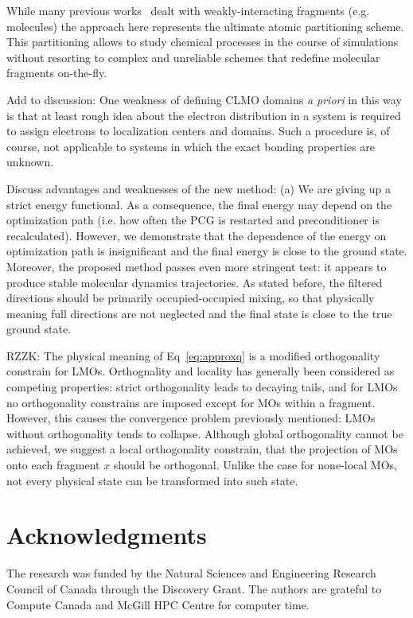 \documentclass[aps,prl,twocolumn,reprint,amsmath,amssymb]{revtex4-1}
\begin{document}
While many previous works~\cite{RZZK} dealt with weakly-interacting fragments (e.g. molecules) the approach here represents the ultimate atomic partitioning scheme. This partitioning allows to study chemical processes in the course of simulations without resorting to complex and unreliable schemes that redefine molecular fragments on-the-fly.

Add to discussion: One weakness of defining CLMO domains \emph{a priori} in this way is that at least rough idea about the electron distribution in a system is required to assign electrons to localization centers and domains. Such a procedure is, of course, not applicable to systems in which the exact bonding properties are unknown.

Discuss advantages and weaknesses of the new method: (a) We are giving up a strict energy functional. As a consequence, the final energy may depend on the optimization path (i.e. how often the PCG is restarted and preconditioner is recalculated). However, we demonstrate that the dependence of the energy on optimization path is insignificant and the final energy is close to the ground state. Moreover, the proposed method passes even more stringent test: it appears to produce stable molecular dynamics trajectories. As stated before, the filtered directions should be primarily occupied-occupied mixing, so that physically meaning full directions are not neglected and the final state is close to the true ground state. 

RZZK: The physical meaning of Eq~\ref{eq:approxq} is a modified orthogonality constrain for LMOs. Orthognality and locality has generally been considered as competing properties: strict orthogonality leads to decaying tails, and for LMOs no orthogonality constrains are imposed except for MOs within a fragment. However, this causes the convergence problem previously mentioned: LMOs without orthogonality tends to collapse. Although global orthogonality cannot be achieved, we suggest a local orthogonality constrain, that the projection of MOs onto each fragment $x$ should be orthogonal. Unlike the case for none-local MOs, not every physical state can be transformed into such state.

\section{Acknowledgments} The research was funded by the Natural Sciences and Engineering Research Council of Canada through the Discovery Grant. The authors are grateful to Compute Canada and McGill HPC Centre for computer time.
\end{document}
